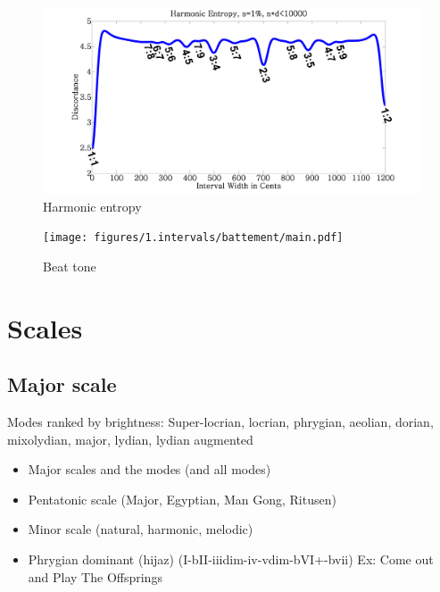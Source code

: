 \documentclass{article}
\begin{document}
\begin{figure}[h!]
	\centering
	\hspace*{0cm}
	\includegraphics[scale=0.03, trim= {0cm 0cm 0cm 0cm}, clip]{figures/1.intervalles/Harmonic_entropy.png}
	\caption{Harmonic entropy}
	\label{fig:harmonic_entro}
\end{figure}

\begin{figure}[h!]
	\centering
	\hspace*{0cm}
	\texttt{[image: figures/1.intervals/battement/main.pdf]}
	\caption{Beat tone}
	\label{fig:battement}
\end{figure}


\newpage
\section{Scales}


\newpage
\subsection{Major scale}
Modes ranked by brightness: Super-locrian, locrian, phrygian, aeolian, dorian, mixolydian, major, lydian, lydian augmented

\begin{itemize}
	\item Major scales and the modes (and all modes)
	\item Pentatonic scale (Major, Egyptian, Man Gong, Ritusen)
	\item Minor scale (natural, harmonic, melodic)
	\item Phrygian dominant (hijaz) (I-bII-iiidim-iv-vdim-bVI+-bvii)  Ex: Come out and Play The Offsprings
\end{itemize}
\end{document}
